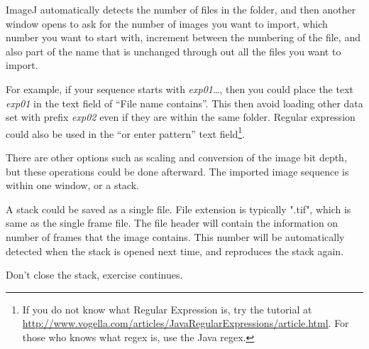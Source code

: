\begin{indentexercise}{1}
ImageJ automatically detects the number of files in the folder, and then another
window opens to ask for the number of images you want to import, which number
you want to start with, increment between the numbering of the file, and also
part of the name that is unchanged through out all the files you want to import.

For example, if your sequence starts with \textit{exp01}\ldots, then you could place the text \textit{exp01} in the text field of ``File name contains''. This then avoid loading other data set with prefix \textit{exp02} even if they are within the same folder. Regular expression could also be used in the ``or enter pattern'' text field\footnote{If you do not know what Regular Expression is, try the tutorial at \url{http://www.vogella.com/articles/JavaRegularExpressions/article.html}. For those who knows what regex is, use the Java regex.}. 

There are other options such as scaling and conversion of the image bit depth,
but these operations could be done afterward. The imported image sequence is within one window, or a stack.

A stack could be saved as a single file. File extension is
typically ".tif", which is same as the single frame file. The file header will contain the
information on number of frames that the image contains. This number
will be automatically detected when the stack is opened next time, and
reproduces the stack again. 
\end{indentexercise}

Don't close the stack, exercise continues. 

